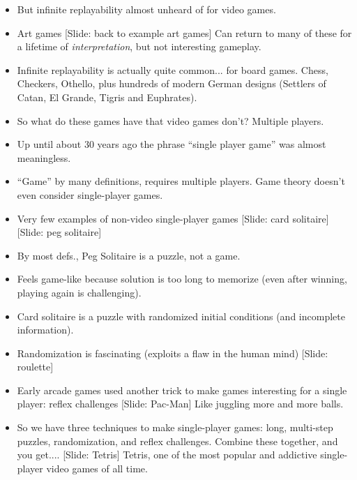 \documentclass[12pt]{article}
\begin{document}
{\begin{itemize}
\item But infinite replayability almost unheard of for video games.

\item Art games [Slide:  back to example art games]  Can return to many of these for a lifetime of {\it interpretation}, but not interesting gameplay.

\item Infinite replayability is actually quite common... for board games.  Chess, Checkers, Othello, plus hundreds of modern German designs (Settlers of Catan, El Grande, Tigris and Euphrates).

\item So what do these games have that video games don't?  Multiple players.

\item Up until about 30 years ago the phrase ``single player game'' was almost meaningless.  

\item ``Game'' by many definitions, requires multiple players.  Game theory doesn't even consider single-player games.


\item Very few examples of non-video single-player games [Slide: card solitaire] [Slide: peg solitaire]

\item By most defs., Peg Solitaire is a puzzle, not a game.  

\item Feels game-like because solution is too long to memorize (even after winning, playing again is challenging).

\item Card solitaire is a puzzle with randomized initial conditions (and incomplete information).

\item Randomization is fascinating (exploits a flaw in the human mind) [Slide: roulette]

\item Early arcade games used another trick to make games interesting for a single player:  reflex challenges [Slide:  Pac-Man]  Like juggling more and more balls.

\item So we have three techniques to make single-player games:  long, multi-step puzzles, randomization, and reflex challenges.  Combine these together, and you get.... [Slide:  Tetris]  Tetris, one of the most popular and addictive single-player video games of all time.


\end{itemize}}
\end{document}
